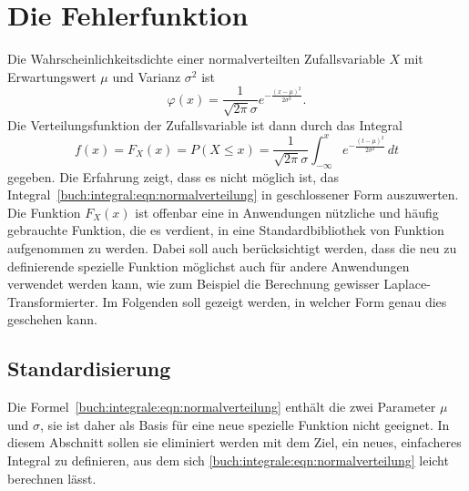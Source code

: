 %
%
%
\section{Die Fehlerfunktion
\label{buch:integrale:section:fehlerfunktion}}
Die Wahrscheinlichkeitsdichte einer normalverteilten Zufallsvariable $X$
mit Erwartungswert $\mu$ und Varianz $\sigma^2$ ist
\begin{equation}
\varphi(x)
=
\frac{1}{\sqrt{2\pi}\sigma}
e^{-\frac{(x-\mu)^2}{2\sigma^2}}.
\label{buch:integrale:eqn:normaldichte}
\end{equation}
Die Verteilungsfunktion der Zufallsvariable ist dann durch das Integral
\begin{equation}
f(x)
=
F_X(x)
=
P(X\le x)
=
\frac{1}{\sqrt{2\pi}\sigma}
\int_{-\infty}^x 
e^{-\frac{(t-\mu)^2}{2\sigma^2}}
\,dt
\label{buch:integrale:eqn:normalverteilung}
\end{equation}
gegeben.
Die Erfahrung zeigt, dass es nicht möglich ist, das
Integral~\eqref{buch:integral:eqn:normalverteilung}
in geschlossener Form auszuwerten.
Die Funktion $F_X(x)$ ist offenbar eine in Anwendungen nützliche und
häufig gebrauchte Funktion, die es verdient, in eine Standardbibliothek
von Funktion aufgenommen zu werden.
Dabei soll auch berücksichtigt werden, dass die neu zu definierende
spezielle Funktion möglichst auch für andere Anwendungen verwendet
werden kann, wie zum Beispiel die Berechnung gewisser Laplace-Transformierter.
Im Folgenden soll gezeigt werden, in welcher Form genau dies geschehen
kann.

%
%
\subsection{Standardisierung}
Die Formel~\ref{buch:integrale:eqn:normalverteilung} enthält die zwei 
Parameter $\mu$ und $\sigma$, sie ist daher als Basis für eine neue
spezielle Funktion nicht geeignet.
In diesem Abschnitt sollen sie eliminiert werden mit dem Ziel, ein
neues, einfacheres Integral zu definieren, aus dem sich 
\ref{buch:integrale:eqn:normalverteilung} leicht berechnen lässt.

